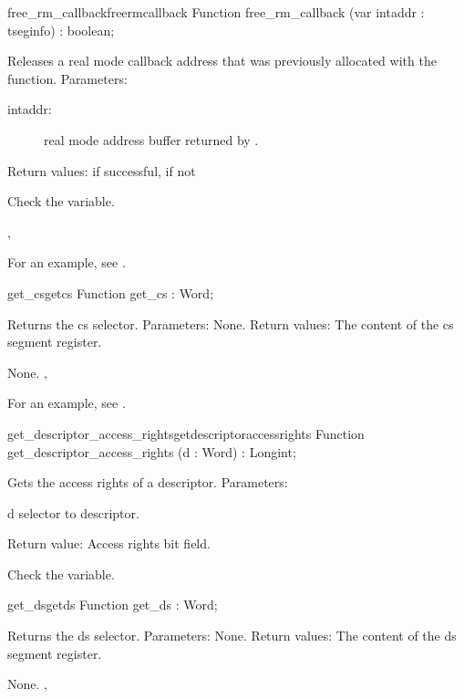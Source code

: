\begin{functionl}{free\_rm\_callback}{freermcallback}
\Declaration
Function free\_rm\_callback (var intaddr : tseginfo) : boolean;

\Description

Releases a real mode callback address that was previously allocated with the
  function.
Parameters: 
\begin{description}
\item[intaddr:\ ] real mode address buffer returned by 
 .
\end{description}
Return values:  if successful,  if not

\Errors
 Check the  variable.
\SeeAlso

,

\end{functionl}
For an example, see .
\begin{functionl}{get\_cs}{getcs}
\Declaration
Function get\_cs  : Word;

\Description

Returns the cs selector.
Parameters: None.
Return values: The content of the cs segment register.

\Errors
None.
\SeeAlso
 , 
\end{functionl}
For an example, see .
\begin{functionl}{get\_descriptor\_access\_rights}{getdescriptoraccessrights}
\Declaration
Function get\_descriptor\_access\_rights (d : Word) : Longint;

\Description
Gets the access rights of a descriptor.
Parameters: 
\begin{description}
\item{d} selector to descriptor.
\end{description}
Return value: Access rights bit field.

\Errors
Check the  variable.
\SeeAlso
 
\end{functionl}
\begin{functionl}{get\_ds}{getds}
\Declaration
Function get\_ds  : Word;

\Description
Returns the ds selector.
Parameters: None.
Return values: The content of the ds segment register.

\Errors
 None.
\SeeAlso
 , 
\end{functionl}
